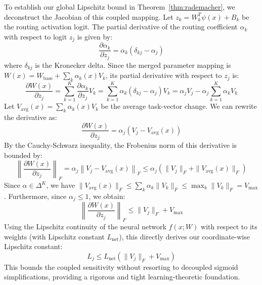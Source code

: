 \documentclass{article}
\theoremstyle{plain}
\theoremstyle{definition}
\theoremstyle{remark}
\begin{document}
To establish our global Lipschitz bound in Theorem~\ref{thm:rademacher}, we deconstruct the Jacobian of this coupled mapping. Let $z_k = W_k^T \psi(x) + B_k$ be the routing activation logit. The partial derivative of the routing coefficient $\alpha_k$ with respect to logit $z_j$ is given by:
\begin{equation}
    \frac{\partial \alpha_k}{\partial z_j} = \alpha_k \left( \delta_{kj} - \alpha_j \right)
\end{equation}
where $\delta_{kj}$ is the Kronecker delta. Since the merged parameter mapping is $W(x) = W_{\text{base}} + \sum_k \alpha_k(x) V_k$, its partial derivative with respect to $z_j$ is:
\begin{equation}
    \frac{\partial W(x)}{\partial z_j} = \sum_{k=1}^K \frac{\partial \alpha_k}{\partial z_j} V_k = \sum_{k=1}^K \alpha_k \left( \delta_{kj} - \alpha_j \right) V_k = \alpha_j V_j - \alpha_j \sum_{k=1}^K \alpha_k V_k
\end{equation}
Let $V_{\text{avg}}(x) = \sum_k \alpha_k(x) V_k$ be the average task-vector change. We can rewrite the derivative as:
\begin{equation}
    \frac{\partial W(x)}{\partial z_j} = \alpha_j \left( V_j - V_{\text{avg}}(x) \right)
\end{equation}
By the Cauchy-Schwarz inequality, the Frobenius norm of this derivative is bounded by:
\begin{equation}
    \left\| \frac{\partial W(x)}{\partial z_j} \right\|_F = \alpha_j \left\| V_j - V_{\text{avg}}(x) \right\|_F \le \alpha_j \left( \|V_j\|_F + \|V_{\text{avg}}(x)\|_F \right)
\end{equation}
Since $\alpha \in \Delta^K$, we have $\|V_{\text{avg}}(x)\|_F \le \sum_k \alpha_k \|V_k\|_F \le \max_k \|V_k\|_F = V_{\max}$. Furthermore, since $\alpha_j \le 1$, we obtain:
\begin{equation}
    \left\| \frac{\partial W(x)}{\partial z_j} \right\|_F \le \|V_j\|_F + V_{\max}
\end{equation}
Using the Lipschitz continuity of the neural network $f(x; W)$ with respect to its weights (with Lipschitz constant $L_{\text{net}}$), this directly derives our coordinate-wise Lipschitz constant:
\begin{equation}
    L_j \le L_{\text{net}} \left( \|V_j\|_F + V_{\max} \right)
\end{equation}
This bounds the coupled sensitivity without resorting to decoupled sigmoid simplifications, providing a rigorous and tight learning-theoretic foundation.
\end{document}
